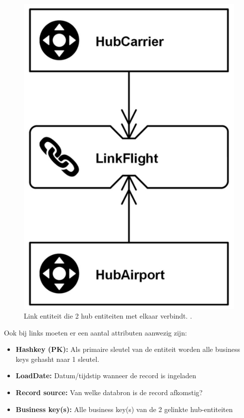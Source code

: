 \begin{figure}[h]
	\centering
	\includegraphics[scale=0.3]{../images/link.png}
	\caption{Link entiteit die 2 hub entiteiten met elkaar verbindt. \autocite{Linstedt2016}.}
	\label{fig:link}
\end{figure}

Ook bij links moeten er een aantal attributen aanwezig zijn:

\begin{itemize}
	\item \textbf{Hashkey (PK):} Als primaire sleutel van de entiteit worden alle business keys gehasht naar 1 sleutel.
	\item \textbf{LoadDate:} Datum/tijdstip wanneer de record is ingeladen
	\item \textbf{Record source:} Van welke databron is de record afkomstig?
	\item \textbf{Business key(s):} Alle business key(s) van de 2 gelinkte hub-entiteiten
\end{itemize} 

